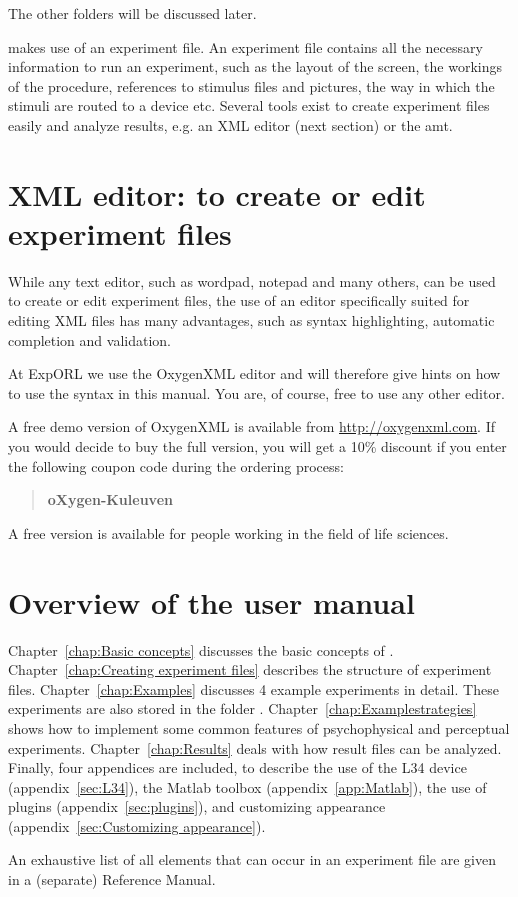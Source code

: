 The other folders will be discussed later.


\apex makes use of an experiment file. An experiment file contains
all the necessary information to run an experiment, such as the
layout of the screen, the workings of the procedure, references to
stimulus files and pictures, the way in which the stimuli are
routed to a device etc. Several tools exist to create experiment
files easily and analyze results, e.g. an XML editor (next
section) or the \ac{amt}.

\section{XML editor: to create or edit experiment files}

While any text editor, such as wordpad, notepad and many others,
can be used to create or edit experiment files, the use of an
editor specifically suited for editing XML files has many
advantages, such as syntax highlighting, automatic completion and
validation.

At ExpORL we use the OxygenXML editor and will therefore give
hints on how to use the syntax in this manual. You are, of course,
free to use any other editor.

A free demo version of OxygenXML is available from
\url{http://oxygenxml.com}. If you would decide to buy the full
version, you will get a 10\% discount if you enter the following
coupon code during the ordering process:
\begin{quote}
    \textbf{oXygen-Kuleuven}
\end{quote}
\label{sec:XML editor}

A free version is available for people working in the field of
life sciences.

\section{Overview of the \apex user manual}

Chapter~\ref{chap:Basic concepts} discusses the basic concepts of
\apex. Chapter~\ref{chap:Creating experiment files} describes the
structure of experiment files. Chapter~\ref{chap:Examples}
discusses 4 example experiments in detail. These experiments are
also stored in the folder .
Chapter~\ref{chap:Examplestrategies} shows how to implement some
common features of psychophysical and perceptual experiments.
Chapter~\ref{chap:Results} deals with how \apex result files can
be analyzed. Finally, four appendices are included, to describe
the use of the L34 device (appendix~\ref{sec:L34}), the Matlab
toolbox (appendix~\ref{app:Matlab}), the use of plugins
(appendix~\ref{sec:plugins}), and customizing appearance
(appendix~\ref{sec:Customizing appearance}).

An exhaustive list of all elements that can occur in an \apex
experiment file are given in a (separate) \apex Reference Manual.
